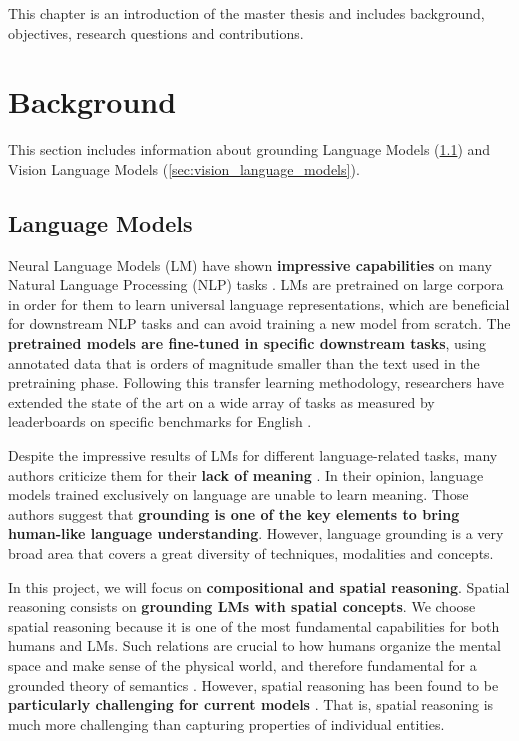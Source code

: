 This chapter is an introduction of the master thesis and includes background, objectives, research questions and contributions.

\section{Background}

This section includes information about grounding Language Models (\ref{sec:language_models}) and Vision Language Models (\ref{sec:vision_language_models}).

\subsection{Language Models} \label{sec:language_models}

Neural Language Models (LM) have shown \textbf{impressive capabilities} on many Natural Language Processing (NLP) tasks \cite{wang2019superglue, brown2020language, chowdhery2022palm}. LMs are pretrained on large corpora in order for them to learn universal language representations, which are beneficial for downstream NLP tasks and can avoid training a new model from scratch. The \textbf{pretrained models are fine-tuned in specific downstream tasks}, using annotated data that is orders of magnitude smaller than the text used in the pretraining phase. Following this transfer learning methodology, researchers have extended the state of the art on a wide array of tasks as measured by leaderboards on specific benchmarks for English \cite{bommasani2021opportunities, wang2019superglue}.

Despite the impressive results of LMs for different language-related tasks, many authors criticize them for their \textbf{lack of meaning} \cite{bender2020climbing, bender2021dangers}. In their opinion, language models trained exclusively on language are unable to learn meaning. Those authors suggest that \textbf{grounding is one of the key elements to bring human-like language understanding}. However, language grounding is a very broad area that covers a great diversity of techniques, modalities and concepts. 

In this project, we will focus on \textbf{compositional and spatial reasoning}. Spatial reasoning consists on \textbf{grounding LMs with spatial concepts}. We choose spatial reasoning because it is one of the most fundamental capabilities for both humans and LMs. Such relations are crucial to how humans organize the mental space and make sense of the physical world, and therefore fundamental for a grounded theory of semantics \cite{levinson2003space}. However, spatial reasoning has been found to be \textbf{particularly challenging for current models} \cite{akula2020words}. That is, spatial reasoning is much more challenging than capturing properties of individual entities.

